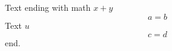 \documentclass[10pt]{article}
\begin{document}
Text ending with math $x+y$
\[ a = b \]
Text $u$ \begin{equation} c = d \end{equation}
end.
\end{document}
